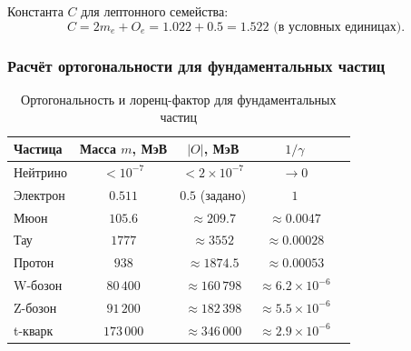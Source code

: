 \documentclass[12pt,a4paper]{article}
\begin{document}
Константа $C$ для лептонного семейства:
\begin{equation}
    C = 2m_e + O_e = 1.022 + 0.5 = 1.522 \text{ (в условных единицах)}.
\end{equation}

\subsubsection{Расчёт ортогональности для фундаментальных частиц}

\begin{table}[h]
    \centering
    \caption{Ортогональность и лоренц-фактор для фундаментальных частиц}
    \begin{tabular}{lcccc}
        \toprule
        Частица & Масса $m$, МэВ & $|O|$, МэВ & $1/\gamma$ \\
        \midrule
        Нейтрино & $<10^{-7}$ & $<2\times10^{-7}$ & $\to 0$ \\
        Электрон & $0.511$ & $0.5$ (задано) & $1$ \\
        Мюон & $105.6$ & $\approx 209.7$ & $\approx 0.0047$ \\
        Тау & $1777$ & $\approx 3552$ & $\approx 0.00028$ \\
        Протон & $938$ & $\approx 1874.5$ & $\approx 0.00053$ \\
        W-бозон & $80\,400$ & $\approx 160\,798$ & $\approx 6.2\times10^{-6}$ \\
        Z-бозон & $91\,200$ & $\approx 182\,398$ & $\approx 5.5\times10^{-6}$ \\
        t-кварк & $173\,000$ & $\approx 346\,000$ & $\approx 2.9\times10^{-6}$ \\
        \bottomrule
    \end{tabular}
    \label{tab:particles}
\end{table}
\end{document}
